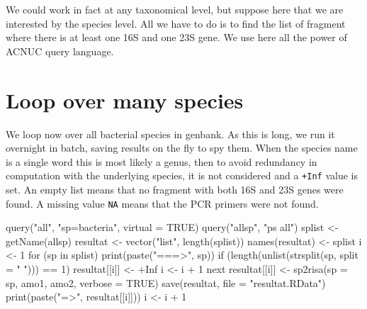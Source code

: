 \documentclass{article}
\begin{document}
We could work in fact at any taxonomical level, but suppose here that
we are interested by the species level. All we have to do is to find
the list of fragment where there is at least one 16S and one 23S gene.
We use here all the power of ACNUC query language.

\begin{Schunk}
\end{Schunk}


\section{Loop over many species}

We loop now over all bacterial species in genbank. As this is long, we run
it overnight in batch, saving results on the fly to spy them.
When the species name is a single word this is most likely a genus,
then to avoid redundancy in computation with the underlying species,
it is not considered and a \texttt{+Inf} value is set. An empty list
means that no fragment with both 16S and 23S genes were found. A
missing value \texttt{NA} means that the PCR primers were not found.

\begin{Schunk}
\begin{Sinput}
 query("all", "sp=bacteria", virtual = TRUE)
 query("allsp", "ps all")
 splist <- getName(allsp)
 resultat <- vector("list", length(splist))
 names(resultat) <- splist
 i <- 1
 for (sp in splist) {
     print(paste("===>", sp))
     if (length(unlist(strsplit(sp, split = " "))) == 1) {
         resultat[[i]] <- +Inf
         i <- i + 1
         next
     }
     resultat[[i]] <- sp2risa(sp = sp, amo1, amo2, verbose = TRUE)
     save(resultat, file = "resultat.RData")
     print(paste("=>", resultat[[i]]))
     i <- i + 1
 }
\end{Sinput}
\end{Schunk}
\end{document}
